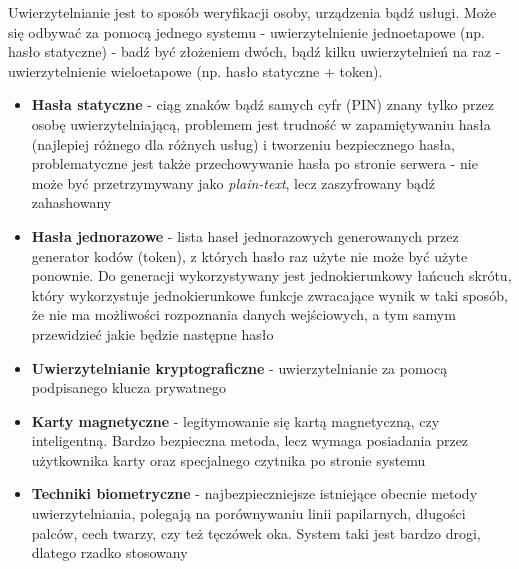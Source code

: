 Uwierzytelnianie jest to sposób weryfikacji osoby, urządzenia bądź usługi. Może się odbywać za pomocą jednego systemu - uwierzytelnienie jednoetapowe (np. hasło statyczne) - badź być złożeniem dwóch, bądź kilku uwierzytelnień na raz - uwierzytelnienie wieloetapowe (np. hasło statyczne + token).
\begin{itemize}
	\item \textbf{Hasła statyczne} - ciąg znaków bądź samych cyfr (PIN) znany tylko przez osobę uwierzytelniającą, problemem jest trudność w zapamiętywaniu hasła (najlepiej różnego dla różnych usług) i tworzeniu bezpiecznego hasła, problematyczne jest także przechowywanie hasła po stronie serwera - nie może być przetrzymywany jako \textit{plain-text}, lecz zaszyfrowany bądź zahashowany
    \item \textbf{Hasła jednorazowe} - lista haseł jednorazowych generowanych przez generator kodów (token), z których hasło raz użyte nie może być użyte ponownie. Do generacji wykorzystywany jest jednokierunkowy łańcuch skrótu, który wykorzystuje jednokierunkowe funkcje zwracające wynik w taki sposób, że nie ma możliwości rozpoznania danych wejściowych, a tym samym przewidzieć jakie będzie następne hasło
    \item \textbf{Uwierzytelnianie kryptograficzne} - uwierzytelnianie za pomocą podpisanego klucza prywatnego
    \item \textbf{Karty magnetyczne} - legitymowanie się kartą magnetyczną, czy inteligentną. Bardzo bezpieczna metoda, lecz wymaga posiadania przez użytkownika karty oraz specjalnego czytnika po stronie systemu
    \item \textbf{Techniki biometryczne} - najbezpieczniejsze istniejące obecnie metody uwierzytelniania, polegają na porównywaniu linii papilarnych, długości palców, cech twarzy, czy też tęczówek oka. System taki jest bardzo drogi, dlatego rzadko stosowany
\end{itemize}
